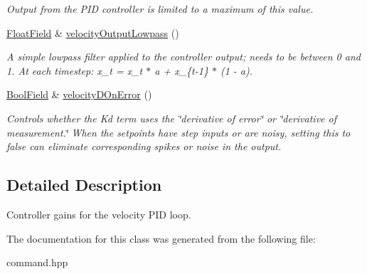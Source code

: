 \begin{DoxyCompactItemize}
\begin{DoxyCompactList}\small\item\em Output from the P\+ID controller is limited to a maximum of this value. \end{DoxyCompactList}\item 
\hyperlink{classhebi_1_1Command_1_1FloatField}{Float\+Field} \& \hyperlink{classhebi_1_1Command_1_1Settings_1_1Actuator_1_1VelocityGains_af9258452e76fad7bbd0249b5f8567d02}{velocity\+Output\+Lowpass} ()\hypertarget{classhebi_1_1Command_1_1Settings_1_1Actuator_1_1VelocityGains_af9258452e76fad7bbd0249b5f8567d02}{}\label{classhebi_1_1Command_1_1Settings_1_1Actuator_1_1VelocityGains_af9258452e76fad7bbd0249b5f8567d02}

\begin{DoxyCompactList}\small\item\em A simple lowpass filter applied to the controller output; needs to be between 0 and 1. At each timestep\+: x\+\_\+t = x\+\_\+t $\ast$ a + x\+\_\+\{t-\/1\} $\ast$ (1 -\/ a). \end{DoxyCompactList}\item 
\hyperlink{classhebi_1_1Command_1_1BoolField}{Bool\+Field} \& \hyperlink{classhebi_1_1Command_1_1Settings_1_1Actuator_1_1VelocityGains_a986a2c7629468de54443dfb4a77a6fb2}{velocity\+D\+On\+Error} ()\hypertarget{classhebi_1_1Command_1_1Settings_1_1Actuator_1_1VelocityGains_a986a2c7629468de54443dfb4a77a6fb2}{}\label{classhebi_1_1Command_1_1Settings_1_1Actuator_1_1VelocityGains_a986a2c7629468de54443dfb4a77a6fb2}

\begin{DoxyCompactList}\small\item\em Controls whether the Kd term uses the \char`\"{}derivative of error\char`\"{} or \char`\"{}derivative of measurement.\char`\"{} When the setpoints have step inputs or are noisy, setting this to {\ttfamily false} can eliminate corresponding spikes or noise in the output. \end{DoxyCompactList}\end{DoxyCompactItemize}


\subsection{Detailed Description}
Controller gains for the velocity P\+ID loop. 

The documentation for this class was generated from the following file\+:\begin{DoxyCompactItemize}
\item 
command.\+hpp\end{DoxyCompactItemize}
